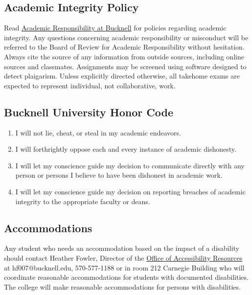 \documentclass[11pt]{article} %
\begin{document}
  \subsection{Academic Integrity Policy}
  
    Read \href{"http://www.bucknell.edu/AcademicResponsibility.xml"}{Academic Responsibility at Bucknell} for policies regarding academic integrity. Any questions concerning academic responsibility or misconduct will be referred to the Board of Review for Academic Responsibility without hesitation. Always cite the source of any information from outside sources, including online sources and classmates. Assignments may be screened using software designed to detect plaigarism. Unless explicitly directed otherwise, all takehome exams are expected to represent individual, not collaborative, work.
  
  \subsection{Bucknell University Honor Code}
  \begin{enumerate}
  \item I will not lie, cheat, or steal in my academic endeavors.
  \item I will forthrightly oppose each and every instance of academic dishonesty.
  \item I will let my conscience guide my decision to communicate directly with any person or persons I believe to have been dishonest in academic work.
  \item I will let my conscience guide my decision on reporting breaches of academic integrity to the appropriate faculty or deans.
\end{enumerate}

  \subsection{Accommodations}
  
  Any student who needs an accommodation based on the impact of a disability should contact Heather Fowler, Director of the \href{https://www.bucknell.edu/about-bucknell/accessibility-resources/services-and-resources-for-students/academic-accommodations}{Office of Accessibility Resources} at hf007@bucknell.edu, 570-577-1188 or in room 212 Carnegie Building who will coordinate reasonable accommodations for students with documented disabilities. The college will make reasonable accommodations for persons with disabilities. 
\end{document}
